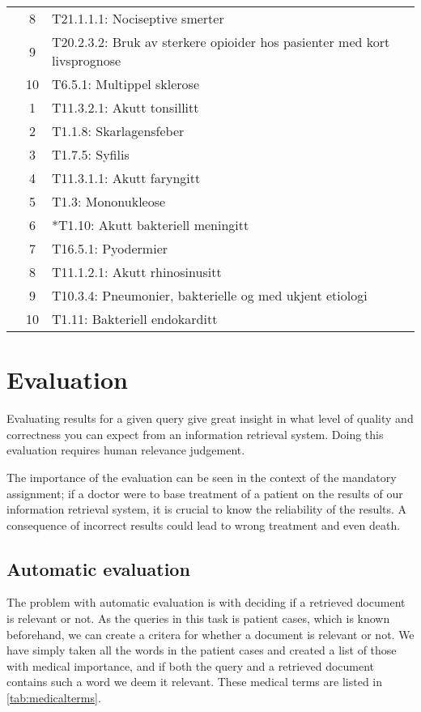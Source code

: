 \documentclass[a4paper, 11pt]{article}
\begin{document}
\begin{table}[htbp]
\begin{tabularx}{\textwidth}{c c X}
	 & 8 & T21.1.1.1: Nociseptive smerter \\
	 & 9 & T20.2.3.2: Bruk av sterkere opioider hos pasienter med kort livsprognose \\
	 & 10 & T6.5.1: Multippel sklerose \\
	\addlinespace
	8 & 1 & T11.3.2.1: Akutt tonsillitt \\
	 & 2 & T1.1.8: Skarlagensfeber \\
	 & 3 & T1.7.5: Syfilis \\
	 & 4 & T11.3.1.1: Akutt faryngitt \\
	 & 5 & T1.3: Mononukleose \\
	 & 6 & *T1.10: Akutt bakteriell meningitt \\
	 & 7 & T16.5.1: Pyodermier \\
	 & 8 & T11.1.2.1: Akutt rhinosinusitt \\
	 & 9 & T10.3.4: Pneumonier, bakterielle og med ukjent etiologi \\
	 & 10 & T1.11: Bakteriell endokarditt \\
	\bottomrule
\end{tabularx}
\end{table}


\section{Evaluation}
\label{sec:evaluation}
Evaluating results for a given query give great insight in what level of quality and correctness you can expect from an information retrieval system. Doing this evaluation requires human relevance judgement.

The importance of the evaluation can be seen in the context of the mandatory assignment; if a doctor were to base treatment of a patient on the results of our information retrieval system, it is crucial to know the reliability of the results. A consequence of incorrect results could lead to wrong treatment and even death.


\subsection{Automatic evaluation}
The problem with automatic evaluation is with deciding if a retrieved document
is relevant or not. As the queries in this task is patient cases, which is
known beforehand, we can create a critera for whether a document is relevant
or not. We have simply taken all the words in the patient cases and created a
list of those with medical importance, and if both the query and a retrieved
document contains such a word we deem it relevant. These medical terms are
listed in \autoref{tab:medicalterms}.
\end{document}
